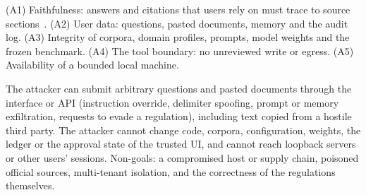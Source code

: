  (A1) Faithfulness: answers and citations that users rely on must trace to source sections~\citep{magesh2025hallucination}. (A2) User data: questions, pasted documents, memory and the audit log. (A3) Integrity of corpora, domain profiles, prompts, model weights and the frozen benchmark. (A4) The tool boundary: no unreviewed write or egress. (A5) Availability of a bounded local machine.

 The attacker can submit arbitrary questions and pasted documents through the interface or API (instruction override, delimiter spoofing, prompt or memory exfiltration, requests to evade a regulation), including text copied from a hostile third party. The attacker cannot change code, corpora, configuration, weights, the ledger or the approval state of the trusted UI, and cannot reach loopback servers or other users' sessions. Non-goals: a compromised host or supply chain, poisoned official sources, multi-tenant isolation, and the correctness of the regulations themselves.


